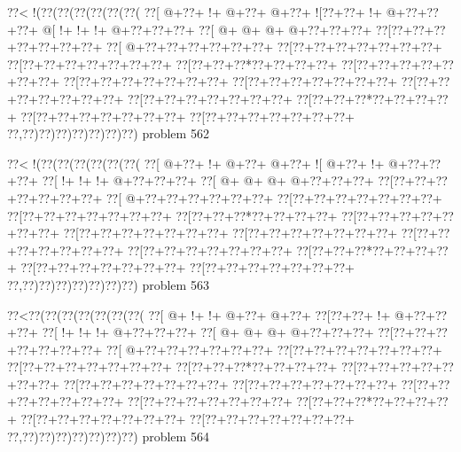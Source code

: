 \vbox{\vbox{\goo
\0??<\- !(\0??(\0??(\0??(\0??(\0??(\0??(
\0??[\- @+\0??+\- !+\- @+\0??+\- @+\0??+
\- ![\0??+\0??+\- !+\- @+\0??+\0??+\0??+
\- @[\- !+\- !+\- !+\- @+\0??+\0??+\0??+
\0??[\- @+\- @+\- @+\- @+\0??+\0??+\0??+
\0??[\0??+\0??+\0??+\0??+\0??+\0??+\0??+
\0??[\- @+\0??+\0??+\0??+\0??+\0??+\0??+
\0??[\0??+\0??+\0??+\0??+\0??+\0??+\0??+
\0??[\0??+\0??+\0??+\0??+\0??+\0??+\0??+
\0??[\0??+\0??+\0??*\0??+\0??+\0??+\0??+
\0??[\0??+\0??+\0??+\0??+\0??+\0??+\0??+
\0??[\0??+\0??+\0??+\0??+\0??+\0??+\0??+
\0??[\0??+\0??+\0??+\0??+\0??+\0??+\0??+
\0??[\0??+\0??+\0??+\0??+\0??+\0??+\0??+
\0??[\0??+\0??+\0??+\0??+\0??+\0??+\0??+
\0??[\0??+\0??+\0??*\0??+\0??+\0??+\0??+
\0??[\0??+\0??+\0??+\0??+\0??+\0??+\0??+
\0??[\0??+\0??+\0??+\0??+\0??+\0??+\0??+
\0??,\0??)\0??)\0??)\0??)\0??)\0??)\0??)
}
\hfil problem 562\hfil\break
}

\vbox{\vbox{\goo
\0??<\- !(\0??(\0??(\0??(\0??(\0??(\0??(
\0??[\- @+\0??+\- !+\- @+\0??+\- @+\0??+
\- ![\- @+\0??+\- !+\- @+\0??+\0??+\0??+
\0??[\- !+\- !+\- !+\- @+\0??+\0??+\0??+
\0??[\- @+\- @+\- @+\- @+\0??+\0??+\0??+
\0??[\0??+\0??+\0??+\0??+\0??+\0??+\0??+
\0??[\- @+\0??+\0??+\0??+\0??+\0??+\0??+
\0??[\0??+\0??+\0??+\0??+\0??+\0??+\0??+
\0??[\0??+\0??+\0??+\0??+\0??+\0??+\0??+
\0??[\0??+\0??+\0??*\0??+\0??+\0??+\0??+
\0??[\0??+\0??+\0??+\0??+\0??+\0??+\0??+
\0??[\0??+\0??+\0??+\0??+\0??+\0??+\0??+
\0??[\0??+\0??+\0??+\0??+\0??+\0??+\0??+
\0??[\0??+\0??+\0??+\0??+\0??+\0??+\0??+
\0??[\0??+\0??+\0??+\0??+\0??+\0??+\0??+
\0??[\0??+\0??+\0??*\0??+\0??+\0??+\0??+
\0??[\0??+\0??+\0??+\0??+\0??+\0??+\0??+
\0??[\0??+\0??+\0??+\0??+\0??+\0??+\0??+
\0??,\0??)\0??)\0??)\0??)\0??)\0??)\0??)
}
\hfil problem 563\hfil\break
}

\vbox{\vbox{\goo
\0??<\0??(\0??(\0??(\0??(\0??(\0??(\0??(
\0??[\- @+\- !+\- !+\- @+\0??+\- @+\0??+
\0??[\0??+\0??+\- !+\- @+\0??+\0??+\0??+
\0??[\- !+\- !+\- !+\- @+\0??+\0??+\0??+
\0??[\- @+\- @+\- @+\- @+\0??+\0??+\0??+
\0??[\0??+\0??+\0??+\0??+\0??+\0??+\0??+
\0??[\- @+\0??+\0??+\0??+\0??+\0??+\0??+
\0??[\0??+\0??+\0??+\0??+\0??+\0??+\0??+
\0??[\0??+\0??+\0??+\0??+\0??+\0??+\0??+
\0??[\0??+\0??+\0??*\0??+\0??+\0??+\0??+
\0??[\0??+\0??+\0??+\0??+\0??+\0??+\0??+
\0??[\0??+\0??+\0??+\0??+\0??+\0??+\0??+
\0??[\0??+\0??+\0??+\0??+\0??+\0??+\0??+
\0??[\0??+\0??+\0??+\0??+\0??+\0??+\0??+
\0??[\0??+\0??+\0??+\0??+\0??+\0??+\0??+
\0??[\0??+\0??+\0??*\0??+\0??+\0??+\0??+
\0??[\0??+\0??+\0??+\0??+\0??+\0??+\0??+
\0??[\0??+\0??+\0??+\0??+\0??+\0??+\0??+
\0??,\0??)\0??)\0??)\0??)\0??)\0??)\0??)
}
\hfil problem 564\hfil\break
}

